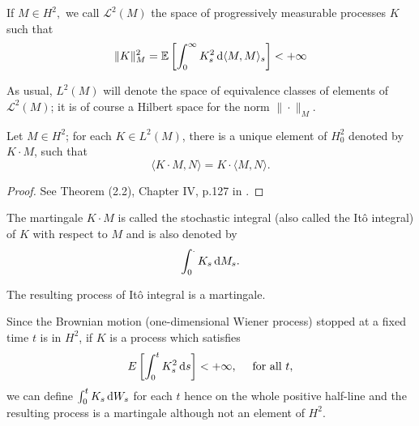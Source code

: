 \begin{definition}
	If $M \in H^{2},$ we call $\mathscr{L}^{2}(M)$ the space of progressively measurable processes $K$ such that
	\[ \|K\|_{M}^{2}=\mathbb{E}\left[\int_{0}^{\infty} K_{s}^{2} \,\mathrm{d} \langle M, M\rangle_{s}\right]<+\infty \]
\end{definition}
As usual, $L^{2}(M)$ will denote the space of equivalence classes of elements of $\mathscr{L}^{2}(M)$; it is of course a Hilbert space for the norm $\|\cdot\|_{M}$.
\begin{theorem}
	Let $M \in H^{2}$; for each $K \in L^{2}(M)$, there is a unique element of $H_{0}^{2}$ denoted by $K \cdot M$, such that \[ \langle K \cdot M, N\rangle=K \cdot\langle M, N\rangle. \]
\end{theorem}
\begin{proof}
	See Theorem (2.2), Chapter IV, p.127 in \cite{revuz2013continuous}.
\end{proof}
\begin{definition}
	The martingale $K \cdot M$ is called the stochastic integral (also called the Itô integral) of $K$ with respect to $M$ and is also denoted by
	\[ \int_{0}^{.} K_{s} \,\mathrm{d} M_{s} .\]
\end{definition}
The resulting process of Itô integral is a martingale.

%
%
\begin{remark}\label{rmk:ito_integral_Brownian_motion}
	Since the Brownian motion (one-dimensional Wiener process) stopped at a fixed time $t$ is in $H^{2}$, if $K$ is a process which satisfies
	\[ E\left[\int_{0}^{t} K_{s}^{2} \,\mathrm{d} s\right]<+\infty, \quad \text { for all } t,	 \]
	we can define $\int_{0}^{t} K_{s} \,\mathrm{d} W_{s}$ for each $t$ hence on the whole positive half-line and the resulting process is a martingale although not an element of $H^{2} $.
\end{remark}

